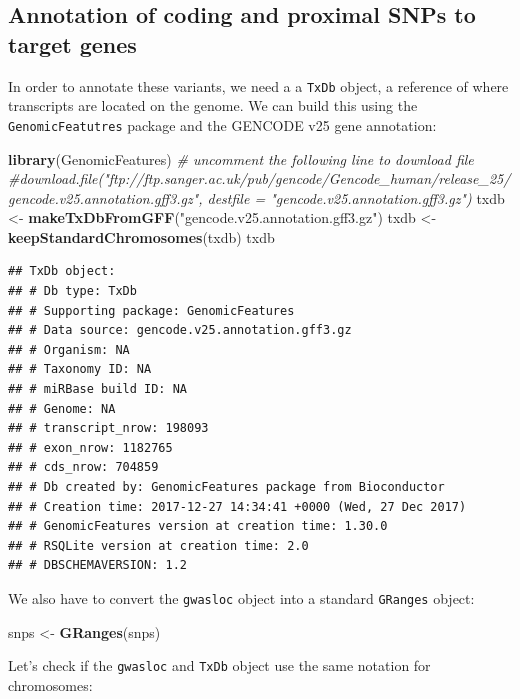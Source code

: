 \documentclass[9pt,a4paper,]{extarticle}
\newenvironment{Shaded}{\begin{snugshade}}{\end{snugshade}}
\newcommand{\KeywordTok}[1]{\textcolor[rgb]{0.13,0.29,0.53}{\textbf{#1}}}
\newcommand{\StringTok}[1]{\textcolor[rgb]{0.31,0.60,0.02}{#1}}
\newcommand{\CommentTok}[1]{\textcolor[rgb]{0.56,0.35,0.01}{\textit{#1}}}
\newcommand{\NormalTok}[1]{#1}
\begin{document}
\subsection{Annotation of coding and proximal SNPs to target genes}\label{annotation-of-coding-and-proximal-snps-to-target-genes}

In order to annotate these variants, we need a a \texttt{TxDb} object, a reference of where transcripts are located on the genome.
We can build this using the \texttt{GenomicFeatutres} \citep{Lawrence2013} package and the GENCODE v25 gene annotation:

\begin{Shaded}
\begin{Highlighting}[]
\KeywordTok{library}\NormalTok{(GenomicFeatures)}
\CommentTok{# uncomment the following line to download file}
\CommentTok{#download.file("ftp://ftp.sanger.ac.uk/pub/gencode/Gencode_human/release_25/gencode.v25.annotation.gff3.gz", destfile = "gencode.v25.annotation.gff3.gz")}
\NormalTok{txdb <-}\StringTok{ }\KeywordTok{makeTxDbFromGFF}\NormalTok{(}\StringTok{"gencode.v25.annotation.gff3.gz"}\NormalTok{)}
\NormalTok{txdb <-}\StringTok{ }\KeywordTok{keepStandardChromosomes}\NormalTok{(txdb)}
\NormalTok{txdb}
\end{Highlighting}
\end{Shaded}

\begin{verbatim}
## TxDb object:
## # Db type: TxDb
## # Supporting package: GenomicFeatures
## # Data source: gencode.v25.annotation.gff3.gz
## # Organism: NA
## # Taxonomy ID: NA
## # miRBase build ID: NA
## # Genome: NA
## # transcript_nrow: 198093
## # exon_nrow: 1182765
## # cds_nrow: 704859
## # Db created by: GenomicFeatures package from Bioconductor
## # Creation time: 2017-12-27 14:34:41 +0000 (Wed, 27 Dec 2017)
## # GenomicFeatures version at creation time: 1.30.0
## # RSQLite version at creation time: 2.0
## # DBSCHEMAVERSION: 1.2
\end{verbatim}

We also have to convert the \texttt{gwasloc} object into a standard \texttt{GRanges} object:

\begin{Shaded}
\begin{Highlighting}[]
\NormalTok{snps <-}\StringTok{ }\KeywordTok{GRanges}\NormalTok{(snps)}
\end{Highlighting}
\end{Shaded}

Let's check if the \texttt{gwasloc} and \texttt{TxDb} object use the same notation for chromosomes:
\end{document}
